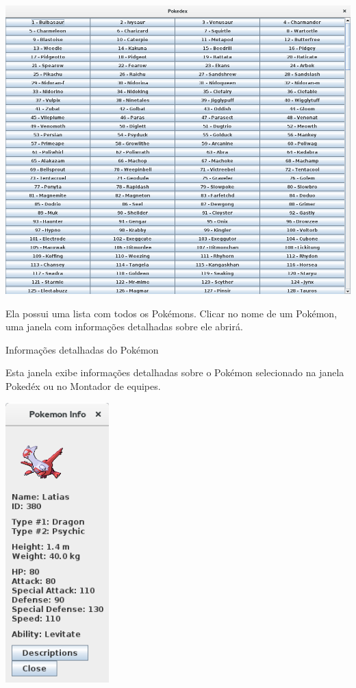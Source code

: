\documentclass[
	article,			%
	12pt,				%
	oneside,			%
	a4paper,			%
	english,			%
	brazil,				%
	sumario=tradicional
	]{abntex2}
\begin{document}
\begin{center}
\includegraphics[width=1\textwidth]{pokedex}\par
\end{center}

Ela possui uma lista com todos os Pokémons. Clicar no nome de um Pokémon, uma janela com informações detalhadas sobre ele abrirá.

\newpage
\begin{center}
{\Large Informações detalhadas do Pokémon}
\end{center}

Esta janela exibe informações detalhadas sobre o Pokémon selecionado na janela Pokedéx ou no Montador de equipes.

\begin{center}
\includegraphics[width=0.3\textwidth]{detail_window}\par
\end{center}
\end{document}
